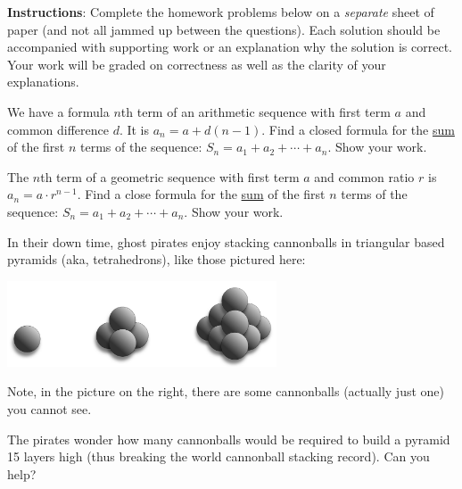 \documentclass[11pt]{exam}
\begin{document}
\noindent \textbf{Instructions}: Complete the homework problems below on a {\em separate} sheet of paper (and not all jammed up between the questions). Each solution should be accompanied with supporting work or an explanation why the solution is correct. Your work will be graded on correctness as well as the clarity of your explanations. 



\begin{questions}
\question[4] We have a formula $n$th term of an arithmetic sequence with first term $a$ and common difference $d$.  It is $a_n = a+d(n-1)$.  Find a closed formula for the \underline{sum} of the first $n$ terms of the sequence: $S_n = a_1 + a_2 + \cdots + a_n$.  Show your work.

\question[4] The $n$th term of a geometric sequence with first term $a$ and common ratio $r$ is $a_n = a\cdot r^{n-1}$.  Find a close formula for the \underline{sum} of the first $n$ terms of the sequence: $S_n = a_1 + a_2 + \cdots + a_n$.  Show your work.


\question[6] In their down time, ghost pirates enjoy stacking cannonballs in triangular based pyramids (aka, tetrahedrons), like those pictured here:

\centerline{\includegraphics[height=1in]{cannonballs.png}}

Note, in the picture on the right, there are some cannonballs (actually just one) you cannot see.  

The pirates wonder how many cannonballs would be required to build a pyramid 15 layers high (thus breaking the world cannonball stacking record).  Can you help?

\end{questions}
\end{document}
